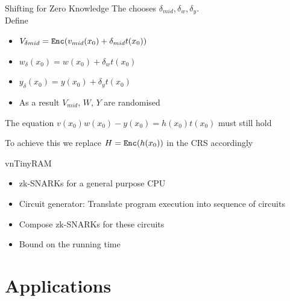 \documentclass[handout]{beamer}
\begin{document}
\begin{frame}{Shifting for Zero Knowledge}
The \prv chooses $\delta_{mid}, \delta_w, \delta_y$. \\
Define 
\begin{itemize}
\item $V_{\delta{mid}} = \mathtt{Enc}(v_{mid}(x_0)+\delta_{mid}t(x_0))$ \pause
\item $w_{\delta}(x_0) = w(x_0)+\delta_w t(x_0)$ \pause
\item $y_{\delta}(x_0) = y(x_0)+\delta_y t(x_0)$ \pause
\item As a result $V_{mid}$, $W$, $Y$ are randomised \pause
\end{itemize}
The equation $v(x_0)w(x_0)-y(x_0)= h(x_0)t(x_0)$ must still hold \pause

To achieve this we replace $H = \mathtt{Enc}(h(x_0))$ in the CRS accordingly

\end{frame}

\begin{frame}{vnTinyRAM}
\begin{itemize}
    \item zk-SNARKs for a general purpose CPU \pause
    \item Circuit generator: Translate program execution into sequence of circuits \pause
    \item Compose zk-SNARKs for these circuits \pause
    \item Bound on the running time \pause
\end{itemize}
\end{frame}

\section{Applications}
\end{document}
